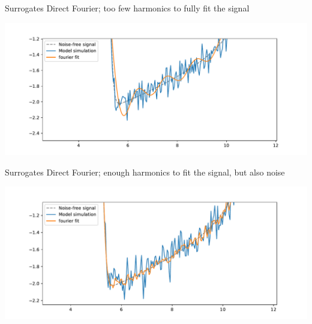 \documentclass[presentation]{beamer}
\begin{document}
\begin{frame}[label={sec:org9a589b5}]{Surrogates}
Direct Fourier; too few harmonics to fully fit the signal

\begin{center}
\includegraphics[width=.9\linewidth]{./needs_more.pdf}
\end{center}
\end{frame}

\begin{frame}[label={sec:orgb4e23d4}]{Surrogates}
Direct Fourier; enough harmonics to fit the signal, but also noise

\begin{center}
\includegraphics[width=.9\linewidth]{./fits_noise.pdf}
\end{center}
\end{frame}
\end{document}

